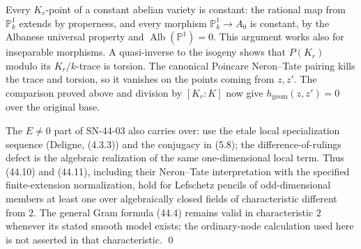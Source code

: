 Every $K_r$-point of a constant abelian variety is constant:
the rational map from $\mathbb P^1_k$ extends by properness,
and every morphism $\mathbb P^1_k\to A_0$ is constant, by the
Albanese universal property and
$\operatorname{Alb}(\mathbb P^1)=0$.  This argument works also
for inseparable morphisms.  A quasi-inverse to the isogeny shows
that $P(K_r)$ modulo its $K_r/k$-trace is torsion.  The canonical
Poincare Neron--Tate pairing kills the trace and torsion, so it
vanishes on the points coming from $z,z'$.  The comparison proved
above and division by $[K_r:K]$ now give
$h_{\mathrm{geom}}(z,z')=0$ over the original base.

The $E\ne0$ part of SN-44-03 also carries over: use the etale
local specialization sequence (Deligne, (4.3.3)) and the
conjugacy in (5.8); the difference-of-rulings defect is the
algebraic realization of the same one-dimensional local term.
Thus (44.10) and (44.11), including their Neron--Tate
interpretation with the specified finite-extension normalization,
hold for Lefschetz pencils of odd-dimensional members at least
one over algebraically closed fields of characteristic
different from $2$.  The general Gram formula (44.4) remains
valid in characteristic $2$ whenever its stated smooth model
exists; the ordinary-node calculation used here is not asserted
in that characteristic. \qed
